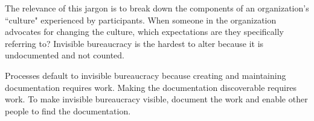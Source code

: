 The relevance of this jargon is to break down the components of an organization's ``culture" experienced by participants.
When someone in the organization advocates for changing the culture, which expectations are they specifically referring to? Invisible bureaucracy is the hardest to alter because it is undocumented and not counted.

Processes default to invisible bureaucracy because creating and maintaining documentation requires work. Making the documentation discoverable requires work.
To make invisible bureaucracy visible, document the work and enable other people to find the documentation.

